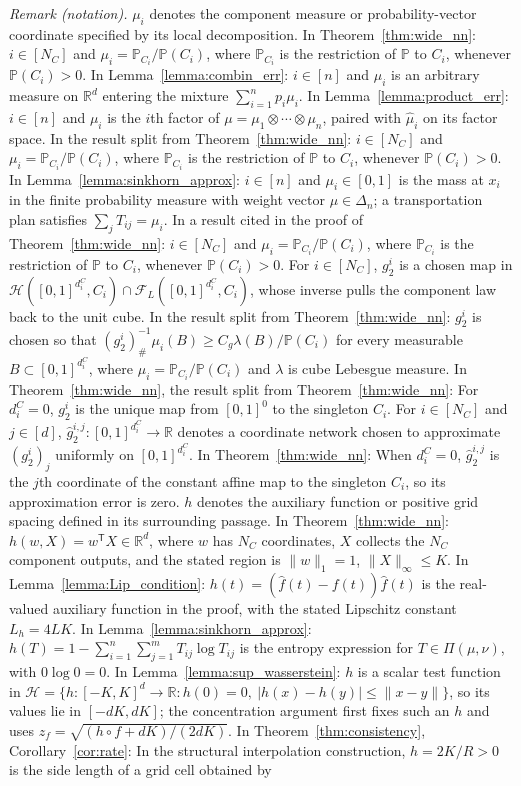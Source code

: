\noindent\textit{Remark (notation).} $\mu_i$ denotes the component measure or probability-vector coordinate specified by its local decomposition. In Theorem~\ref{thm:wide_nn}: $i\in[N_C]$ and $\mu_i=\mathbb{P}_{C_i}/\mathbb{P}(C_i)$, where $\mathbb{P}_{C_i}$ is the restriction of $\mathbb{P}$ to $C_i$, whenever $\mathbb{P}(C_i)>0$. In Lemma~\ref{lemma:combin_err}: $i\in[n]$ and $\mu_i$ is an arbitrary measure on $\mathbb{R}^d$ entering the mixture $\sum_{i=1}^n p_i\mu_i$. In Lemma~\ref{lemma:product_err}: $i\in[n]$ and $\mu_i$ is the $i$th factor of $\mu=\mu_1\otimes\cdots\otimes\mu_n$, paired with $\hat{\mu}_i$ on its factor space. In the result split from Theorem~\ref{thm:wide_nn}: $i\in[N_C]$ and $\mu_i=\mathbb{P}_{C_i}/\mathbb{P}(C_i)$, where $\mathbb{P}_{C_i}$ is the restriction of $\mathbb{P}$ to $C_i$, whenever $\mathbb{P}(C_i)>0$. In Lemma~\ref{lemma:sinkhorn_approx}: $i\in[n]$ and $\mu_i\in[0,1]$ is the mass at $x_i$ in the finite probability measure with weight vector $\mu\in\Delta_n$; a transportation plan satisfies $\sum_jT_{ij}=\mu_i$. In a result cited in the proof of Theorem~\ref{thm:wide_nn}: $i\in[N_C]$ and $\mu_i=\mathbb{P}_{C_i}/\mathbb{P}(C_i)$, where $\mathbb{P}_{C_i}$ is the restriction of $\mathbb{P}$ to $C_i$, whenever $\mathbb{P}(C_i)>0$. For $i\in[N_C]$, $g_2^i$ is a chosen map in $\mathcal{H}([0,1]^{d_i^C},C_i)\cap\mathcal{F}_L([0,1]^{d_i^C},C_i)$, whose inverse pulls the component law back to the unit cube. In the result split from Theorem~\ref{thm:wide_nn}: $g_2^i$ is chosen so that $(g_2^i)^{-1}_{\#}\mu_i(B)\geqslant C_g\lambda(B)/\mathbb{P}(C_i)$ for every measurable $B\subset[0,1]^{d_i^C}$, where $\mu_i=\mathbb{P}_{C_i}/\mathbb{P}(C_i)$ and $\lambda$ is cube Lebesgue measure. In Theorem~\ref{thm:wide_nn}, the result split from Theorem~\ref{thm:wide_nn}: For $d_i^C=0$, $g_2^i$ is the unique map from $[0,1]^0$ to the singleton $C_i$. For $i\in[N_C]$ and $j\in[d]$, $\hat{g}_2^{i,j}:[0,1]^{d_i^C}\rightarrow\mathbb{R}$ denotes a coordinate network chosen to approximate $(g_2^i)_j$ uniformly on $[0,1]^{d_i^C}$. In Theorem~\ref{thm:wide_nn}: When $d_i^C=0$, $\hat{g}_2^{i,j}$ is the $j$th coordinate of the constant affine map to the singleton $C_i$, so its approximation error is zero. $h$ denotes the auxiliary function or positive grid spacing defined in its surrounding passage. In Theorem~\ref{thm:wide_nn}: $h(w,X)=w^{\mathsf{T}}X\in\mathbb{R}^d$, where $w$ has $N_C$ coordinates, $X$ collects the $N_C$ component outputs, and the stated region is $\|w\|_1=1$, $\|X\|_\infty\leqslant K$. In Lemma~\ref{lemma:Lip_condition}: $h(t)=(\hat{f}(t)-f(t))\hat{f}(t)$ is the real-valued auxiliary function in the proof, with the stated Lipschitz constant $L_h=4LK$. In Lemma~\ref{lemma:sinkhorn_approx}: $h(T)=1-\sum_{i=1}^n\sum_{j=1}^m T_{ij}\log T_{ij}$ is the entropy expression for $T\in\Pi(\mu,\nu)$, with $0\log0=0$. In Lemma~\ref{lemma:sup_wasserstein}: $h$ is a scalar test function in $\mathcal H=\{h:[-K,K]^d\rightarrow\mathbb R:h(0)=0,\ |h(x)-h(y)|\leqslant\|x-y\|\}$, so its values lie in $[-dK,dK]$; the concentration argument first fixes such an $h$ and uses $z_f=\sqrt{(h\circ f+dK)/(2dK)}$. In Theorem~\ref{thm:consistency}, Corollary~\ref{cor:rate}: In the structural interpolation construction, $h=2K/R>0$ is the side length of a grid cell obtained by 